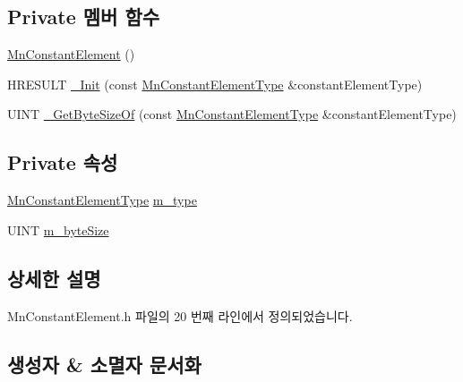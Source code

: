 \subsection*{Private 멤버 함수}
\begin{DoxyCompactItemize}
\item 
\hyperlink{class_m_n_l_1_1_mn_constant_element_aae694955b2ffd802eeb59034e889c62b}{Mn\+Constant\+Element} ()
\item 
H\+R\+E\+S\+U\+LT \hyperlink{class_m_n_l_1_1_mn_constant_element_a226616b9e6e135a920943803bd8d651d}{\+\_\+\+Init} (const \hyperlink{namespace_m_n_l_a7d0c6fcd5ada7e43f4059b8a9b4afb49}{Mn\+Constant\+Element\+Type} \&constant\+Element\+Type)
\item 
U\+I\+NT \hyperlink{class_m_n_l_1_1_mn_constant_element_a34b4574387f535a74ab325a43649ceef}{\+\_\+\+Get\+Byte\+Size\+Of} (const \hyperlink{namespace_m_n_l_a7d0c6fcd5ada7e43f4059b8a9b4afb49}{Mn\+Constant\+Element\+Type} \&constant\+Element\+Type)
\end{DoxyCompactItemize}
\subsection*{Private 속성}
\begin{DoxyCompactItemize}
\item 
\hyperlink{namespace_m_n_l_a7d0c6fcd5ada7e43f4059b8a9b4afb49}{Mn\+Constant\+Element\+Type} \hyperlink{class_m_n_l_1_1_mn_constant_element_a6015e8f0784914bcb9e3beec92de11aa}{m\+\_\+type}
\item 
U\+I\+NT \hyperlink{class_m_n_l_1_1_mn_constant_element_a0b5df25aee74d374cd8f108137f7db6e}{m\+\_\+byte\+Size}
\end{DoxyCompactItemize}


\subsection{상세한 설명}


Mn\+Constant\+Element.\+h 파일의 20 번째 라인에서 정의되었습니다.



\subsection{생성자 \& 소멸자 문서화}
\mbox{\label{class_m_n_l_1_1_mn_constant_element_acf2d83e71ba0f23f91eb704bab1a3c44}} 
